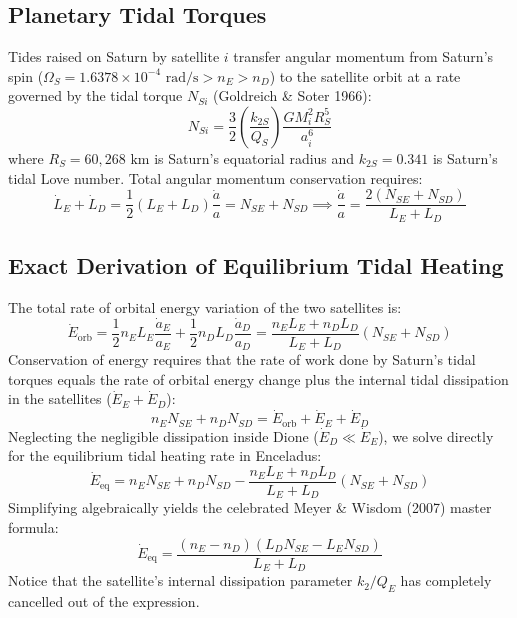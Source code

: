 \documentclass[11pt,a4paper]{article}
\begin{document}
\subsection{Planetary Tidal Torques}
Tides raised on Saturn by satellite $i$ transfer angular momentum from Saturn's spin ($\Omega_S = 1.6378 \times 10^{-4}\text{ rad/s} > n_E > n_D$) to the satellite orbit at a rate governed by the tidal torque $N_{Si}$ (Goldreich \& Soter 1966):
\begin{equation}
N_{Si} = \frac{3}{2} \left(\frac{k_{2S}}{Q_S}\right) \frac{G M_i^2 R_S^5}{a_i^6}
\end{equation}
where $R_S = 60,268\text{ km}$ is Saturn's equatorial radius and $k_{2S} = 0.341$ is Saturn's tidal Love number. Total angular momentum conservation requires:
\begin{equation}
\dot{L}_E + \dot{L}_D = \frac{1}{2}(L_E + L_D) \frac{\dot{a}}{a} = N_{SE} + N_{SD} \implies \frac{\dot{a}}{a} = \frac{2(N_{SE} + N_{SD})}{L_E + L_D}
\end{equation}

\subsection{Exact Derivation of Equilibrium Tidal Heating}
The total rate of orbital energy variation of the two satellites is:
\begin{equation}
\dot{E}_{\text{orb}} = \frac{1}{2} n_E L_E \frac{\dot{a}_E}{a_E} + \frac{1}{2} n_D L_D \frac{\dot{a}_D}{a_D} = \frac{n_E L_E + n_D L_D}{L_E + L_D} (N_{SE} + N_{SD})
\end{equation}
Conservation of energy requires that the rate of work done by Saturn's tidal torques equals the rate of orbital energy change plus the internal tidal dissipation in the satellites ($\dot{E}_E + \dot{E}_D$):
\begin{equation}
n_E N_{SE} + n_D N_{SD} = \dot{E}_{\text{orb}} + \dot{E}_E + \dot{E}_D
\end{equation}
Neglecting the negligible dissipation inside Dione ($\dot{E}_D \ll \dot{E}_E$), we solve directly for the equilibrium tidal heating rate in Enceladus:
\begin{equation}
\dot{E}_{\text{eq}} = n_E N_{SE} + n_D N_{SD} - \frac{n_E L_E + n_D L_D}{L_E + L_D} (N_{SE} + N_{SD})
\end{equation}
Simplifying algebraically yields the celebrated Meyer \& Wisdom (2007) master formula:
\begin{equation}
\boxed{\dot{E}_{\text{eq}} = \frac{(n_E - n_D)(L_D N_{SE} - L_E N_{SD})}{L_E + L_D}}
\end{equation}
Notice that the satellite's internal dissipation parameter $k_2/Q_E$ has completely cancelled out of the expression.
\end{document}
